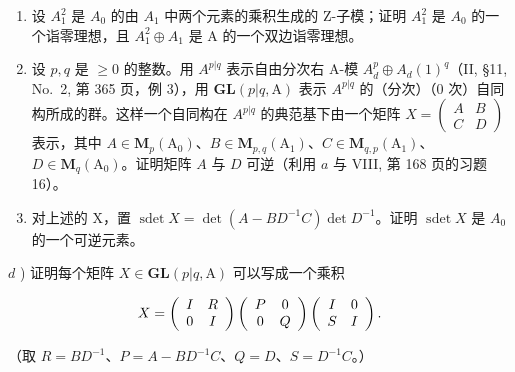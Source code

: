 \begin{enumerate}
\def\labelenumi{\alph{enumi})}
\item
  设 \(A_{1}^{2}\) 是 \(A_{0}\) 的由 \(A_{1}\) 中两个元素的乘积生成的 Z-子模；证明 \(A_{1}^{2}\) 是 \(A_{0}\) 的一个诣零理想，且 \(A_{1}^{2} \oplus A_{1}\) 是 A 的一个双边诣零理想。
\item
  设 \(p, q\) 是 \(\geqslant 0\) 的整数。用 \(A^{p|q}\) 表示自由分次右 A-模 \(A_d^p \oplus A_d(1)^q\)（II, §11, No.~2, 第 365 页，例 3），用 \(\mathbf{GL}(p|q, \mathrm{A})\) 表示 \(A^{p|q}\) 的（分次）（0 次）自同构所成的群。这样一个自同构在 \(A^{p|q}\) 的典范基下由一个矩阵 \(X = \begin{pmatrix} A & B \\ C & D \end{pmatrix}\) 表示，其中 \(A \in \mathbf{M}_p(\mathrm{A}_0)\)、\(B \in \mathbf{M}_{p,q}(\mathrm{A}_1)\)、\(C \in \mathbf{M}_{q,p}(\mathrm{A}_1)\)、\(D \in \mathbf{M}_q(\mathrm{A}_0)\)。证明矩阵 \(A\) 与 \(D\) 可逆（利用 \(a\) 与 VIII, 第 168 页的习题 16）。
\item
  对上述的 X，置 \(\operatorname{sdet} X = \det(A - BD^{-1}C) \det D^{-1}\)。证明 \(\operatorname{sdet} X\) 是 \(A_{0}\) 的一个可逆元素。
\end{enumerate}

\(d\) ) 证明每个矩阵 \(X\in \mathbf{GL}(p|q,\mathrm{A})\) 可以写成一个乘积

\[
X = \left( \begin{array}{c c} I & R \\ 0 & I \end{array} \right) \left( \begin{array}{c c} P & 0 \\ 0 & Q \end{array} \right) \left( \begin{array}{c c} I & 0 \\ S & I \end{array} \right).
\]

（取 \(R = BD^{-1}\)、\(P = A - BD^{-1}C\)、\(Q = D\)、\(S = D^{-1}C\)。）

